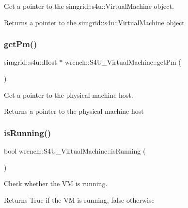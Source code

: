 Get a pointer to the simgrid\+::s4u\+::\+Virtual\+Machine object. 

\begin{DoxyReturn}{Returns}
a pointer to the simgrid\+::s4u\+::\+Virtual\+Machine object 
\end{DoxyReturn}
\mbox{\label{classwrench_1_1_s4_u___virtual_machine_a6e02ca55b7d380f758381b91ced83dea}} 
\subsubsection{\texorpdfstring{get\+Pm()}{getPm()}}
{\footnotesize\ttfamily simgrid\+::s4u\+::\+Host $\ast$ wrench\+::\+S4\+U\+\_\+\+Virtual\+Machine\+::get\+Pm (\begin{DoxyParamCaption}{ }\end{DoxyParamCaption})}



Get a pointer to the physical machine host. 

\begin{DoxyReturn}{Returns}
a pointer to the physical machine host 
\end{DoxyReturn}
\mbox{\label{classwrench_1_1_s4_u___virtual_machine_a5a5f2c45b48758870ac0221fa169ab88}} 
\subsubsection{\texorpdfstring{is\+Running()}{isRunning()}}
{\footnotesize\ttfamily bool wrench\+::\+S4\+U\+\_\+\+Virtual\+Machine\+::is\+Running (\begin{DoxyParamCaption}{ }\end{DoxyParamCaption})}



Check whether the VM is running. 

\begin{DoxyReturn}{Returns}
True if the VM is running, false otherwise 
\end{DoxyReturn}
\mbox{\label{classwrench_1_1_s4_u___virtual_machine_a4da281f4c3fda739d18c5b608c9ef21f}} 
